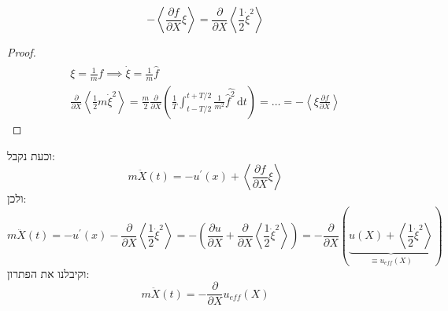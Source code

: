 \documentclass{tstextbook}
\begin{document}
\begin{proposition}
$$-\left\langle\frac{\partial f}{\partial X}\xi\right\rangle=\frac{\partial}{\partial X}\left\langle\frac{1}{2}\dot{\xi}^{2}\right\rangle$$

\end{proposition}
\begin{proof}
\begin{gather*}\xi=\frac{1}{m}\hat{\hat{f}}\implies \dot{\xi}=\frac{1}{m}\hat{f} \\\frac{\partial }{\partial X}\left\langle  \frac{1}{2}m\dot{\xi}^2 \right\rangle =\frac{m}{2}\frac{\partial }{\partial X}\left( \frac{1}{T}\int_{t- T / 2}^{t+T / 2} \frac{1}{m^2}\hat{\hat{f}^2 } \, \mathrm{d}t  \right)=\dots=-\left\langle  \xi \frac{\partial f}{\partial X} \right\rangle 
\end{gather*}

\end{proof}
וכעת נקבל:
$$m\ddot{X}\left(t\right)=-u^{\prime}\left(x\right)+\left\langle\frac{\partial f}{\partial X}\xi\right\rangle$$
ולכן:
$${{m{\ddot{X}}\left(t\right)=-u^{\prime}\left(x\right)-{\frac{\partial}{\partial X}}\left\langle{\frac{1}{2}}{\dot{\xi}}^{2}\right\rangle=-\left({\frac{\partial u}{\partial X}}+{\frac{\partial}{\partial X}}\left\langle{\frac{1}{2}}{\dot{\xi}}^{2}\right\rangle\right)=-{\frac{\partial}{\partial X}}\left(\underbrace{u\left(X\right)+\left\langle{\frac{1}{2}}{\dot{\xi}}^{2}\right\rangle}_{\equiv u_{eff}\left(X\right)}\right)}}$$
וקיבלנו את הפתרון:
$$m\ddot{X}\left(t\right)=-\frac{\partial}{\partial X}u_{e f f}\left(X\right)$$
\end{document}
